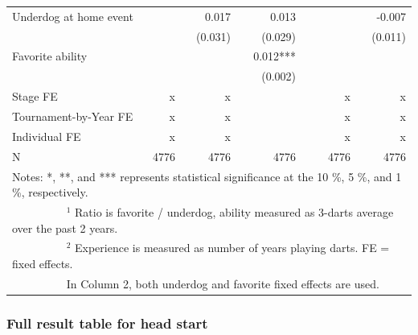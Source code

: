 \documentclass[11pt,a4paper]{article}
\begin{document}
\begin{table}[H]
\begin{tabular}{l r r r r r r}
			Underdog at home event     &             & 0.017     & 0.013     & &           &  -0.007     \\
			                           &             & (0.031)   & (0.029)   & &           &  (0.011)    \\
			Favorite ability           &             &           & 0.012***  & &           &             \\
			                           &             &           & (0.002)   & &           &             \\
			\midrule
			Stage FE    &   x         & x         &           & & x         & x           \\ 
			Tournament-by-Year FE      &   x         & x         &           & & x         & x           \\ 
			Individual FE              &   x         & x         &           & & x         & x           \\
			\midrule 
            N                          &   4776      & 4776      & 4776      & & 4776      &   4776      \\ 
			\bottomrule \bottomrule
			\multicolumn{7}{l}{\footnotesize Notes: *, **, and *** represents statistical significance at the 10 \%, 5 \%, and 1 \%, respectively. }\\
			\multicolumn{7}{l}{\footnotesize ~~~~~~~~~ $^{1}$ Ratio is favorite / underdog, ability measured as 3-darts average over the past 2 years. }\\
			\multicolumn{7}{l}{\footnotesize ~~~~~~~~~ $^{2}$ Experience is measured as number of years playing darts. FE = fixed effects.}\\
			\multicolumn{7}{l}{\footnotesize ~~~~~~~~~ In Column 2, both underdog and favorite fixed effects are used.}
		\end{tabular}
	\end{table}

\subsubsection{Full result table for head start}
\end{document}

